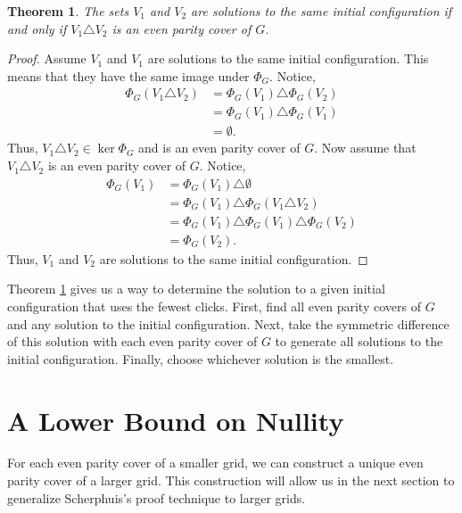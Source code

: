 \documentclass[a4paper]{article}
\newtheorem{theorem}{Theorem}
\begin{document}
	\begin{theorem}\label{iff-even-parity}
		The sets $V_1$ and $V_2$ are solutions to the same initial configuration if and only if $V_1 \triangle V_2$ is an even parity cover of $G$.
	\end{theorem}
	\begin{proof}
		Assume $V_1$ and $V_1$ are solutions to the same initial configuration.
		This means that they have the same image under $\Phi_G$.
		Notice,
		\begin{align*}
			\Phi_G(V_1 \triangle V_2) &= \Phi_G(V_1) \triangle \Phi_G(V_2) \\
				&= \Phi_G(V_1) \triangle \Phi_G(V_1) \\
				&= \emptyset.
		\end{align*}
		Thus, $V_1 \triangle V_2 \in \ker{\Phi_G}$ and is an even parity cover of $G$.
		Now assume that $V_1 \triangle V_2$ is an even parity cover of $G$.
		Notice,
		\begin{align*}
			\Phi_G(V_1) &= \Phi_G(V_1) \triangle \emptyset \\
				&= \Phi_G(V_1) \triangle \Phi_G(V_1 \triangle V_2) \\
				&= \Phi_G(V_1) \triangle \Phi_G(V_1) \triangle \Phi_G(V_2) \\
				&= \Phi_G(V_2).
		\end{align*}
		Thus, $V_1$ and $V_2$ are solutions to the same initial configuration.
	\end{proof}

	Theorem \ref{iff-even-parity} gives us a way to determine the solution to a given initial configuration that uses the fewest clicks.
	First, find all even parity covers of $G$ and any solution to the initial configuration.
	Next, take the symmetric difference of this solution with each even parity cover of $G$ to generate all solutions to the initial configuration.
	Finally, choose whichever solution is the smallest.

	\section{A Lower Bound on Nullity}
	For each even parity cover of a smaller grid, we can construct a unique even parity cover of a larger grid.
	This construction will allow us in the next section to generalize Scherphuis's proof technique to larger grids.
	
\end{document}
